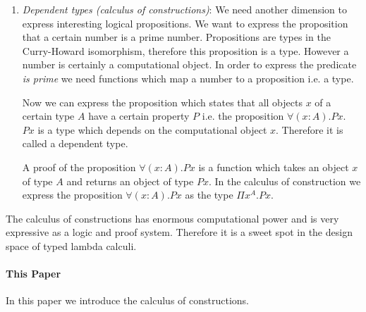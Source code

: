 \begin{enumerate}
\item \emph{Dependent types (calculus of constructions)}:
    We need another dimension to express interesting logical propositions. We
    want to express the proposition that a certain number is a prime number.
    Propositions are types in the Curry-Howard isomorphism, therefore this
    proposition is a type. However a number is certainly a computational
    object. In order to express the predicate \emph{is prime} we need
    functions which map a number to a proposition i.e. a type.

    Now we can express the proposition which states that all objects $x$ of
    a certain type $A$ have a certain property $P$ i.e. the proposition
    $\forall (x:A). P x$. $P x$ is a type which depends on the computational
    object $x$.  Therefore it is called a dependent type.

    A proof of the proposition $\forall (x: A). P x$ is a function which
    takes an object $x$ of type $A$ and returns an object of type $P x$. In
    the calculus of construction we express the proposition $\forall (x: A).
    P x$ as the type $\Pi x^A. P x$.
\end{enumerate}


The calculus of constructions has enormous computational power and is very
expressive as a logic and proof system. Therefore it is a sweet spot in the
design space of typed lambda calculi.



\paragraph{This Paper}
%
In this paper we introduce the calculus of constructions.

